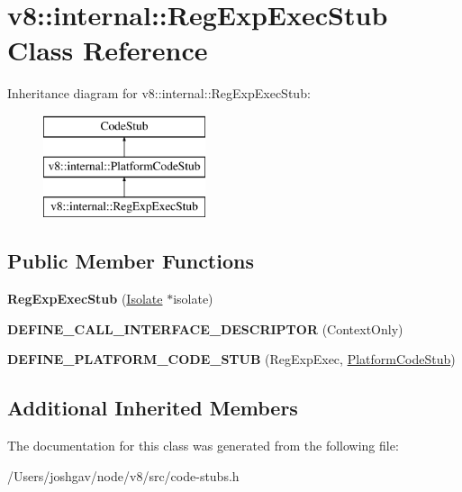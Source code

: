 \hypertarget{classv8_1_1internal_1_1_reg_exp_exec_stub}{}\section{v8\+:\+:internal\+:\+:Reg\+Exp\+Exec\+Stub Class Reference}
\label{classv8_1_1internal_1_1_reg_exp_exec_stub}
Inheritance diagram for v8\+:\+:internal\+:\+:Reg\+Exp\+Exec\+Stub\+:\begin{figure}[H]
\begin{center}
\leavevmode
\includegraphics[height=3.000000cm]{classv8_1_1internal_1_1_reg_exp_exec_stub}
\end{center}
\end{figure}
\subsection*{Public Member Functions}
\begin{DoxyCompactItemize}
\item 
{\bfseries Reg\+Exp\+Exec\+Stub} (\hyperlink{classv8_1_1internal_1_1_isolate}{Isolate} $\ast$isolate)\hypertarget{classv8_1_1internal_1_1_reg_exp_exec_stub_a78d42ac5fdc91baf773cd5927eec7e92}{}\label{classv8_1_1internal_1_1_reg_exp_exec_stub_a78d42ac5fdc91baf773cd5927eec7e92}

\item 
{\bfseries D\+E\+F\+I\+N\+E\+\_\+\+C\+A\+L\+L\+\_\+\+I\+N\+T\+E\+R\+F\+A\+C\+E\+\_\+\+D\+E\+S\+C\+R\+I\+P\+T\+OR} (Context\+Only)\hypertarget{classv8_1_1internal_1_1_reg_exp_exec_stub_a7b0633746ad8bccbbc2e7097989c698a}{}\label{classv8_1_1internal_1_1_reg_exp_exec_stub_a7b0633746ad8bccbbc2e7097989c698a}

\item 
{\bfseries D\+E\+F\+I\+N\+E\+\_\+\+P\+L\+A\+T\+F\+O\+R\+M\+\_\+\+C\+O\+D\+E\+\_\+\+S\+T\+UB} (Reg\+Exp\+Exec, \hyperlink{classv8_1_1internal_1_1_platform_code_stub}{Platform\+Code\+Stub})\hypertarget{classv8_1_1internal_1_1_reg_exp_exec_stub_a9d27ce4f6fc7b05bd6a0f3237611560f}{}\label{classv8_1_1internal_1_1_reg_exp_exec_stub_a9d27ce4f6fc7b05bd6a0f3237611560f}

\end{DoxyCompactItemize}
\subsection*{Additional Inherited Members}


The documentation for this class was generated from the following file\+:\begin{DoxyCompactItemize}
\item 
/\+Users/joshgav/node/v8/src/code-\/stubs.\+h\end{DoxyCompactItemize}
